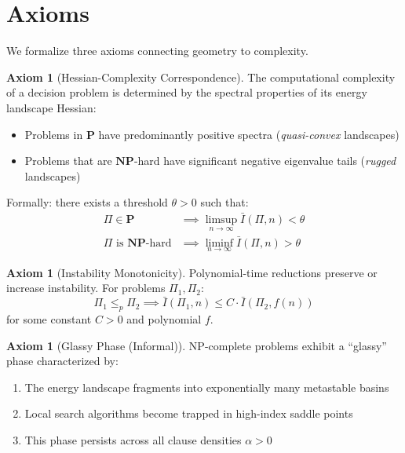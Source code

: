 \documentclass[11pt,a4paper]{article}
\theoremstyle{plain}
\theoremstyle{definition}
\newtheorem{axiom}[theorem]{Axiom}
\theoremstyle{remark}
\newcommand{\Inst}{\bar{I}}
\newcommand{\NP}{\textbf{NP}}
\newcommand{\PP}{\textbf{P}}
\begin{document}
\section{Axioms}

We formalize three axioms connecting geometry to complexity.

\begin{axiom}[Hessian-Complexity Correspondence]\label{ax:correspondence}
The computational complexity of a decision problem is determined by the spectral properties of its energy landscape Hessian:
\begin{itemize}
    \item Problems in $\PP$ have predominantly positive spectra (\emph{quasi-convex} landscapes)
    \item Problems that are $\NP$-hard have significant negative eigenvalue tails (\emph{rugged} landscapes)
\end{itemize}
Formally: there exists a threshold $\theta > 0$ such that:
\begin{align}
    \Pi \in \PP &\implies \limsup_{n \to \infty} \Inst(\Pi, n) < \theta \\
    \Pi \text{ is } \NP\text{-hard} &\implies \liminf_{n \to \infty} \Inst(\Pi, n) > \theta
\end{align}
\end{axiom}

\begin{axiom}[Instability Monotonicity]\label{ax:monotonicity}
Polynomial-time reductions preserve or increase instability. For problems $\Pi_1, \Pi_2$:
\begin{equation}
    \Pi_1 \leq_p \Pi_2 \implies \Inst(\Pi_1, n) \leq C \cdot \Inst(\Pi_2, f(n))
\end{equation}
for some constant $C > 0$ and polynomial $f$.
\end{axiom}

\begin{axiom}[Glassy Phase (Informal)]\label{ax:glassy_informal}
NP-complete problems exhibit a ``glassy'' phase characterized by:
\begin{enumerate}
    \item The energy landscape fragments into exponentially many metastable basins
    \item Local search algorithms become trapped in high-index saddle points
    \item This phase persists across all clause densities $\alpha > 0$
\end{enumerate}
\end{axiom}
\end{document}
